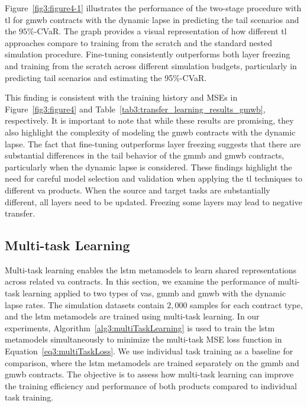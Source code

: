 Figure~\ref{fig3:figure4-1} illustrates the performance of the two-stage procedure with \gls{tl} for \gls{gmwb} contracts with the dynamic lapse in predicting the tail scenarios and the $95\%$-CVaR.
The graph provides a visual representation of how different \gls{tl} approaches compare to training from the scratch and the standard nested simulation procedure.
Fine-tuning consistently outperforms both layer freezing and training from the scratch across different simulation budgets, particularly in predicting tail scenarios and estimating the 95\%-CVaR. 

This finding is consistent with the training history and MSEs in Figure~\ref{fig3:figure4} and Table~\ref{tab3:transfer_learning_results_gmwb}, respectively.
It is important to note that while these results are promising, they also highlight the complexity of modeling the \gls{gmwb} contracts with the dynamic lapse. 
The fact that fine-tuning outperforms layer freezing suggests that there are substantial differences in the tail behavior of the \gls{gmmb} and \gls{gmwb} contracts, particularly when the dynamic lapse is considered. 
These findings highlight the need for careful model selection and validation when applying the \gls{tl} techniques to different \gls{va} products.
When the source and target tasks are substantially different, all layers need to be updated.
Freezing some layers may lead to negative transfer.


\subsection{Multi-task Learning}

Multi-task learning enables the \gls{lstm} metamodels to learn shared representations across related \gls{va} contracts.
In this section, we examine the performance of multi-task learning applied to two types of \gls{va}s, \gls{gmmb} and \gls{gmwb} with the dynamic lapse rates.
The simulation datasets contain $2,\!000$ samples for each contract type, and the \gls{lstm} metamodels are trained using multi-task learning. 
In our experiments, Algorithm~\ref{alg3:multiTaskLearning} is used to train the \gls{lstm} metamodels simultaneously to minimize the multi-task MSE loss function in Equation~\eqref{eq3:multiTaskLoss}.
We use individual task training as a baseline for comparison, where the \gls{lstm} metamodels are trained separately on the \gls{gmmb} and \gls{gmwb} contracts.
The objective is to assess how multi-task learning can improve the training efficiency and performance of both products compared to individual task training.

